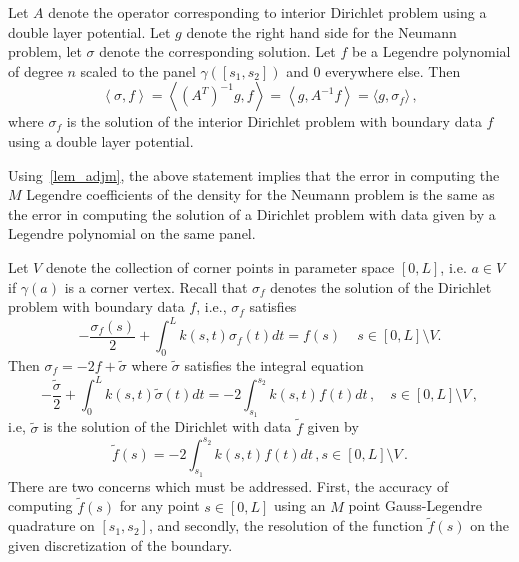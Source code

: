 \documentclass[12pt]{elsarticle}
\begin{document}
Let $A$ denote the operator corresponding to interior Dirichlet problem using a double layer potential. Let $g$ denote the
right hand side for the Neumann problem, let $\sigma$ denote the corresponding solution. Let $f$ be a Legendre polynomial of
degree $n$ scaled to the panel $\gamma([s_{1},s_{2}])$ and $0$ everywhere else. Then
\begin{equation}
\left<\sigma, f \right> = \left< (A^{T})^{-1} g, f\right> = \left< g, A^{-1} f \right> = \langle g, \sigma_{f}\rangle \, ,
\end{equation}
where $\sigma_{f}$ is the solution of the interior Dirichlet problem with boundary data $f$ using a double layer potential.
 

Using~\cref{lem_adjm}, the above statement implies that the error in computing the $M$ Legendre coefficients of
the density for the Neumann problem is the same as the error in computing the solution of a Dirichlet problem with 
data given by a Legendre polynomial on the same panel. 

Let $V$ denote the collection of corner points in parameter space $[0,L]$, i.e. $a \in V$ if $\gamma(a)$ is a corner vertex.
Recall that $\sigma_{f}$ denotes the solution of the Dirichlet problem with boundary data $f$, i.e., 
$\sigma_{f}$ satisfies
\begin{equation}
-\frac{\sigma_{f}(s)}{2}   + \int_{0}^{L} k(s,t) \sigma_{f}(t) dt  = f(s) \,  \quad s\in[0,L]\setminus{V}.
\end{equation}
 Then $\sigma_{f} = -2f + \tilde{\sigma}$ where $\tilde{\sigma}$ satisfies the integral equation
 \begin{equation}
-\frac{\tilde{\sigma}}{2}+ \int_{0}^{L} k(s,t) \tilde{\sigma}(t) dt = -2\int_{s_{1}}^{s_{2}} k(s,t) f(t) dt \, , \quad s\in[0,L] \setminus V \, ,
 \end{equation}
i.e, $\tilde{\sigma}$ is the solution of the Dirichlet with data $\tilde{f}$ given by
\begin{equation}
\tilde{f}(s) = -2\int_{s_{1}}^{s_{2}} k(s,t) f(t) dt \, , s \in [0,L] \setminus V \, .
\end{equation}
There are two concerns which must be addressed. First, the accuracy of computing $\tilde{f}(s)$ 
for any point $s \in [0,L]$ using an $M$ point Gauss-Legendre quadrature on $[s_{1},s_{2}]$, and secondly, 
the resolution of the function $\tilde{f}(s)$ on the given discretization of the boundary. 
\end{document}
